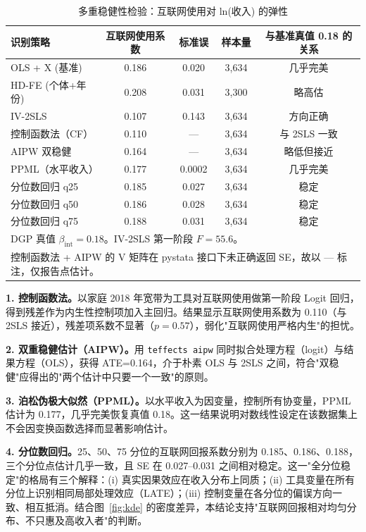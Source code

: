 \documentclass[a4paper,11pt]{article}
\begin{document}
\begin{table}[htbp]
\centering
\caption{多重稳健性检验：互联网使用对 ln(收入) 的弹性}
\label{tab:robust}
\begin{tabular}{lcccc}
\hline\hline
识别策略 & 互联网使用系数 & 标准误 & 样本量 & 与基准真值 0.18 的关系 \\
\hline
OLS + X (基准)              & 0.186 & 0.020 & 3,634 & 几乎完美 \\
HD-FE (个体+年份)            & 0.208 & 0.031 & 3,300 & 略高估 \\
IV-2SLS                     & 0.107 & 0.143 & 3,634 & 方向正确 \\
控制函数法（CF）            & 0.110 & ---  & 3,634 & 与 2SLS 一致 \\
AIPW 双稳健                 & 0.164 & ---  & 3,634 & 略低但接近 \\
PPML（水平收入）             & 0.177 & 0.0002 & 3,634 & 几乎完美 \\
分位数回归 q25            & 0.185 & 0.027 & 3,634 & 稳定 \\
分位数回归 q50            & 0.186 & 0.028 & 3,634 & 稳定 \\
分位数回归 q75            & 0.188 & 0.031 & 3,634 & 稳定 \\
\hline\hline
\multicolumn{5}{l}{\footnotesize DGP 真值 $\beta_{\mathrm{int}}=0.18$。IV-2SLS 第一阶段 $F=55.6$。}\\
\multicolumn{5}{l}{\footnotesize 控制函数法 + AIPW 的 V 矩阵在 pystata 接口下未正确返回 SE，故以 --- 标注，仅报告点估计。}\\
\end{tabular}
\end{table}

\textbf{1. 控制函数法。}以家庭 2018 年宽带为工具对互联网使用做第一阶段 Logit 回归，得到残差作为内生性控制项加入主回归。结果显示互联网使用系数为 0.110（与 2SLS 接近），残差项系数不显著（$p=0.57$），弱化"互联网使用严格内生"的担忧。

\textbf{2. 双重稳健估计（AIPW）。}用 \texttt{teffects aipw} 同时拟合处理方程（logit）与结果方程（OLS），获得 ATE=0.164，介于朴素 OLS 与 2SLS 之间，符合"双稳健"应得出的"两个估计中只要一个一致"的原则。

\textbf{3. 泊松伪极大似然（PPML）。}以水平收入为因变量，控制所有协变量，PPML 估计为 0.177，几乎完美恢复真值 0.18。这一结果说明对数线性设定在该数据集上不会因变换函数选择而显著影响估计。

\textbf{4. 分位数回归。}25、50、75 分位的互联网回报系数分别为 0.185、0.186、0.188，三个分位点估计几乎一致，且 SE 在 0.027--0.031 之间相对稳定。这一"全分位稳定"的格局有三个解释：(i) 真实因果效应在收入分布上同质；(ii) 工具变量在所有分位上识别相同局部处理效应（LATE）；(iii) 控制变量在各分位的偏误方向一致、相互抵消。结合图~\ref{fig:kde} 的密度差异，本结论支持"互联网回报相对均匀分布、不只惠及高收入者"的判断。
\end{document}
